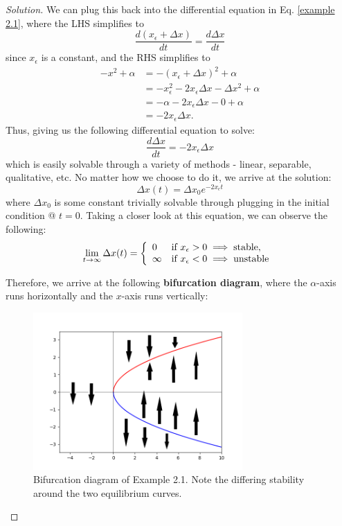 \documentclass{article}
\theoremstyle{definition}
\theoremstyle{remark}
\begin{document}
\begin{proof}[Solution]
We can plug this back into the differential equation in Eq. \ref{example 2.1}, where the LHS simplifies to 
\begin{equation*}
    \frac{d(x_\epsilon + \Delta x)}{dt} = \frac{d\Delta x}{dt}
\end{equation*}
since $x_\epsilon$ is a constant, and the RHS simplifies to 
\begin{align*}
    -x^2 + \alpha &= -(x_\epsilon + \Delta x)^2 + \alpha \\
    &= -x_\epsilon^2 - 2x_\epsilon\Delta x - \Delta x^2 + \alpha \\
    &= -\alpha - 2x_\epsilon\Delta x - 0 + \alpha \\
    &= -2x_\epsilon\Delta x.
\end{align*}
Thus, giving us the following differential equation to solve:
\begin{equation}
    \frac{d\Delta x}{dt} = -2x_\epsilon\Delta x
\end{equation}
which is easily solvable through a variety of methods - linear, separable, qualitative, etc. No matter how we choose to do it, we arrive at the solution:
\begin{equation*}
    \Delta x(t) = \boxed{\Delta x_0 e^{-2x_\epsilon t}}
\end{equation*}
where $\Delta x_0$ is some constant trivially solvable through plugging in the initial condition @ $t = 0$. Taking a closer look at this equation, we can observe the following:
$$
\lim_{t\to\infty}\Delta x(t) = 
\left\{ 
    \begin{array}{ll}
        0 & \mbox{if $x_\epsilon > 0$} \implies \text{stable},  \\
        \infty & \mbox{if $x_\epsilon < 0$} \implies \text{unstable} \\
    \end{array}
\right. \\
$$

Therefore, we arrive at the following \textbf{bifurcation diagram}, where the $\alpha$-axis runs horizontally and the $x$-axis runs vertically:
\begin{figure}[H]
    \centering
    \includegraphics[width=80mm,scale=0.5]{images/Saddle.png}
    \caption{Bifurcation diagram of Example 2.1. Note the differing stability around the two equilibrium curves.}
    \label{fig:saddle}
\end{figure}
\end{proof}
\end{document}
